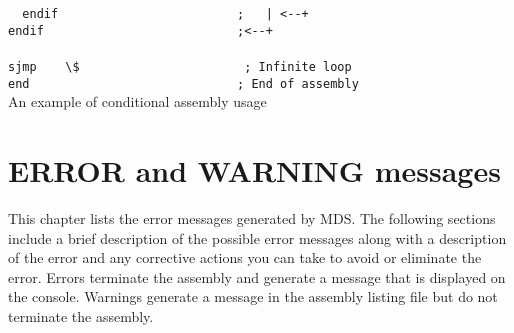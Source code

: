 \begin{code}[h!]
                        \verb'  '{\color{highlight_directive}\verb'endif'}\verb'                         '{\color{highlight_comment}\verb';   | <--+'}\\
                        {\color{highlight_directive}\verb'endif'}\verb'                           '{\color{highlight_comment}\verb';<--+'}\\
                        \verb''\\
                        {\color{highlight_instruction}\verb'sjmp'}\verb'    '{\color{highlight_constant}\verb'\$'}\verb'                       '{\color{highlight_comment}\verb'; Infinite loop'}\\
                        {\color{highlight_directive}\verb'end'}\verb'                             '{\color{highlight_comment}\verb'; End of assembly'}\\
                        \caption{An example of conditional assembly usage}
                \end{code}


                \clearpage
        \section{ERROR and WARNING messages}
        This chapter lists the error messages generated by MDS. The following sections
        include a brief description of the possible error messages along with a
        description of the error and any corrective actions you can take to avoid or
        eliminate the error. Errors terminate the assembly and generate a message that is displayed on
        the console. Warnings generate a message in the assembly listing file but do not terminate the assembly.
